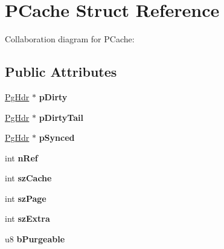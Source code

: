 \hypertarget{struct_p_cache}{\section{P\+Cache Struct Reference}
\label{struct_p_cache}
}


Collaboration diagram for P\+Cache\+:
\subsection*{Public Attributes}
\begin{DoxyCompactItemize}
\item 
\hypertarget{struct_p_cache_a1c692ce92c7d3fc7c6c1324d5658b252}{\hyperlink{struct_pg_hdr}{Pg\+Hdr} $\ast$ {\bfseries p\+Dirty}}\label{struct_p_cache_a1c692ce92c7d3fc7c6c1324d5658b252}

\item 
\hypertarget{struct_p_cache_a8eaca309bfb8fa49e7c5e77dd3398bb0}{\hyperlink{struct_pg_hdr}{Pg\+Hdr} $\ast$ {\bfseries p\+Dirty\+Tail}}\label{struct_p_cache_a8eaca309bfb8fa49e7c5e77dd3398bb0}

\item 
\hypertarget{struct_p_cache_a607eabd6768dd8df47d8fa353542b106}{\hyperlink{struct_pg_hdr}{Pg\+Hdr} $\ast$ {\bfseries p\+Synced}}\label{struct_p_cache_a607eabd6768dd8df47d8fa353542b106}

\item 
\hypertarget{struct_p_cache_a8270710a90112645a69cea03ab5a2d25}{int {\bfseries n\+Ref}}\label{struct_p_cache_a8270710a90112645a69cea03ab5a2d25}

\item 
\hypertarget{struct_p_cache_a93ed4b9d731d883c3ed22a5adfd9c636}{int {\bfseries sz\+Cache}}\label{struct_p_cache_a93ed4b9d731d883c3ed22a5adfd9c636}

\item 
\hypertarget{struct_p_cache_abb0bd0a3292780dcc07cb59bc577990d}{int {\bfseries sz\+Page}}\label{struct_p_cache_abb0bd0a3292780dcc07cb59bc577990d}

\item 
\hypertarget{struct_p_cache_abcb37fcd3ea098b98a196a3f69e3c135}{int {\bfseries sz\+Extra}}\label{struct_p_cache_abcb37fcd3ea098b98a196a3f69e3c135}

\item 
\hypertarget{struct_p_cache_a87ff1d0738734375524e544cefa33b01}{u8 {\bfseries b\+Purgeable}}\label{struct_p_cache_a87ff1d0738734375524e544cefa33b01}


\end{DoxyCompactItemize}
